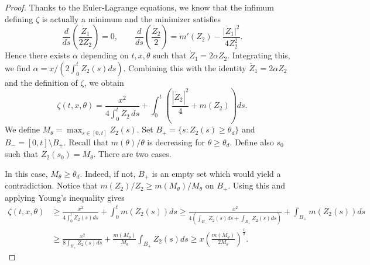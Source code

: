 \documentclass[11pt]{article}    %
\begin{document}
\begin{proof}%
Thanks to the Euler-Lagrange equations, we know that the infimum defining $\zeta$ is actually a minimum and the minimizer satisfies
\begin{equation*}
\frac{d}{ds} \left( \frac{\dot Z_1}{2 Z_2} \right) = 0,\qquad \frac{d}{ds} \left( \frac{\dot Z_2}{2}\right) = m'(Z_2) - \frac{\vert\dot  Z_1 \vert^2}{4 Z_2^2}.
\end{equation*}
Hence there exists $\alpha$ depending on $t,x,\theta$ such that $\dot Z_1 = 2\alpha Z_2$.
Integrating this, we find $\alpha = x/(2 \int_0^t Z_2(s) ds)$.
Combining this with the identity $\dot Z_1 = 2\alpha Z_2$ and the definition of $\zeta$, we obtain
\begin{equation}\label{eq:rhosimple}
	\zeta(t,x,\theta) = \frac{x^2}{4 \int_0^t Z_2 \, ds}  + \int_0^t \left( \frac{|\dot Z_2 |^2}{4} + m(Z_2 ) \right) ds.
\end{equation}
We define $M_\theta = \max_{s \in [0,t]} Z_2(s)$. Set $B_+ = \{s: Z_2(s) \geq \theta_d\}$ and $B_- = [0,t]\setminus B_+$.  Recall that $m(\theta)/\theta$ is decreasing for $\theta\geq \theta_d$.    Define also $s_0$ such that $Z_2(s_0) = M_\theta$.  There are two cases.

\medskip


\medskip

In this case, $M_\theta \geq \theta_d$. Indeed, if not, $B_+$ is an empty set which would yield a contradiction. Notice that $m(Z_2)/Z_2 \geq m(M_\theta)/M_\theta$ on $B_+$. Using this and applying Young's inequality gives
\begin{equation}\label{eq:zetabound}
\begin{split}
	\zeta(t,x,\theta) &\geq \frac{x^2}{4\int_0^t Z_2(s)ds} + \int_0^t m(Z_2(s))ds
		\geq \frac{x^2}{4\left(\int_{B_-} Z_2(s) ds + \int_{B_+} Z_2(s)ds\right)} + \int_{B_+} m(Z_2(s))ds\\
		&\geq \frac{x^2}{8 \int_{B_+} Z_2(s)ds} + \frac{m(M_\theta)}{M_\theta} \int_{B_+} Z_2(s)ds
		\geq x \left( \frac{m(M_\theta)}{2M_\theta} \right)^\frac{1}{2}.
\end{split}
\end{equation}


\end{proof}
\end{document}
